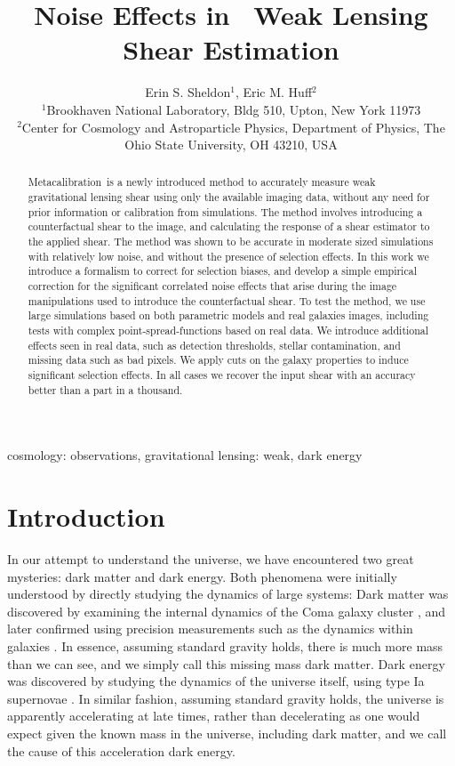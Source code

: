 \documentclass[a4paper,fleqn,usenatbib]{mnras}
\title{Noise Effects in \Mcal\ Weak Lensing Shear Estimation}
\author[Sheldon et al.]{Erin S. Sheldon$^1$, Eric M. Huff$^2$\\
$^1$Brookhaven National Laboratory, Bldg 510, Upton, New York 11973\\
$^2$Center for Cosmology and Astroparticle Physics, Department of Physics, The Ohio State University, OH 43210, USA }
\newcommand{\Mcal}{Metacalibration}
\begin{document}
\maketitle

\begin{abstract}

\Mcal\ is a newly introduced method to accurately measure weak gravitational
lensing shear using only the available imaging data, without any need for prior
information or calibration from simulations.  The method involves introducing a
counterfactual shear to the image, and calculating the response of a shear
estimator to the applied shear.  The method was shown to be accurate in
moderate sized simulations with relatively low noise, and without the presence
of selection effects.  In this work we introduce a formalism to correct for
selection biases, and develop a simple empirical correction for the significant
correlated noise effects that arise during the image manipulations used to
introduce the counterfactual shear.  To test the method, we use large
simulations based on both parametric models and real galaxies images, including
tests with complex point-spread-functions based on real data.  We introduce
additional effects seen in real data, such as detection thresholds, stellar
contamination, and missing data such as bad pixels.  We apply cuts on the
galaxy properties to induce significant selection effects.  In all cases we
recover the input shear with an accuracy better than a part in a thousand.

\end{abstract}


\begin{keywords}                                                                    
    cosmology: observations,
    gravitational lensing: weak,
    dark energy
\end{keywords} 

\section{Introduction} \label{sec:intro}

In our attempt to understand the universe, we have encountered two great
mysteries: dark matter and dark energy.  Both phenomena were initially
understood by directly studying the dynamics of large systems:  Dark matter was
discovered by examining the internal dynamics of the Coma galaxy cluster
\citep{Zwicky33,Zwicky37}, and later confirmed using precision measurements such as the
dynamics within galaxies \citep{Rubin1978a,Rubin1980}.  In essence, assuming
standard gravity holds, there is much more mass than we can see, and we simply
call this missing mass dark matter.  Dark energy was discovered by studying the
dynamics of the universe itself, using type Ia supernovae
\citep{Riess98,Perlmutter99}.  In similar fashion, assuming standard gravity
holds, the universe is apparently accelerating at late times, rather than
decelerating as one would expect given the known mass in the universe,
including dark matter, and we call the cause of this acceleration dark energy.
\end{document}
